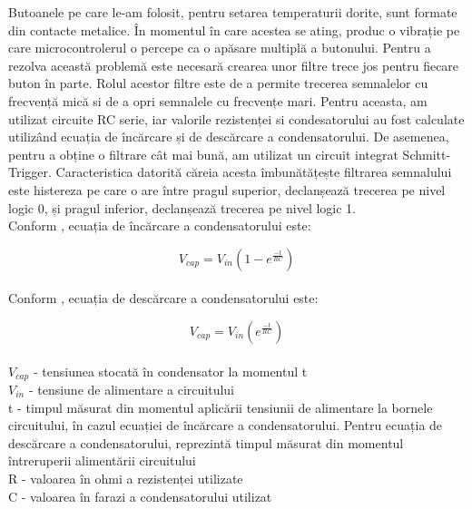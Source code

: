 	Butoanele pe care le-am folosit, pentru setarea temperaturii dorite, sunt formate din contacte metalice. În momentul în care acestea se ating, produc o vibrație pe care microcontrolerul o percepe ca o apăsare multiplă a butonului. Pentru a rezolva această problemă este necesară crearea unor filtre trece jos \cite{buttonDebouncing} pentru fiecare buton în parte. Rolul acestor filtre este de a permite trecerea semnalelor cu frecvență mică si de a opri semnalele cu frecvențe mari. Pentru aceasta, am utilizat circuite RC serie, iar valorile rezistenței si condesatorului au fost calculate utilizând ecuația de încărcare și de descărcare a condensatorului. De asemenea, pentru a obține o filtrare cât mai bună, am utilizat un circuit integrat Schmitt-Trigger. Caracteristica datorită căreia acesta îmbunătățește filtrarea semnalului este histereza pe care o are între pragul superior, declanșează trecerea pe nivel logic 0, și pragul inferior, declanșează trecerea pe nivel logic 1.  
\vspace{1em}\\
Conform \cite{buttonDebouncing}, ecuația de încărcare a condensatorului este:

\begin{equation}
V_{cap} = V_{in}(1-e^{\frac{-t}{RC}})
\end{equation}
\vspace{1em}\\
Conform \cite{buttonDebouncing}, ecuația de descărcare a condensatorului este:

\begin{equation}
V_{cap} = V_{in}(e^{\frac{-t}{RC}})                 
\end{equation}
\vspace{1em}\\
$V_{cap}$ - tensiunea stocată în condensator la momentul t
\vspace{0.7em}\\
$V_{in}$ - tensiune de alimentare a circuitului
\vspace{0.7em}\\
t - timpul măsurat din momentul aplicării tensiunii de alimentare la bornele circuitului, în cazul ecuației de încărcare a condensatorului. Pentru ecuația de descărcare a condensatorului, reprezintă timpul măsurat din momentul întreruperii alimentării circuitului
\vspace{0.7em}\\
R - valoarea în ohmi a rezistenței utilizate
\vspace{0.7em}\\
C - valoarea în farazi a condensatorului utilizat\\ 

